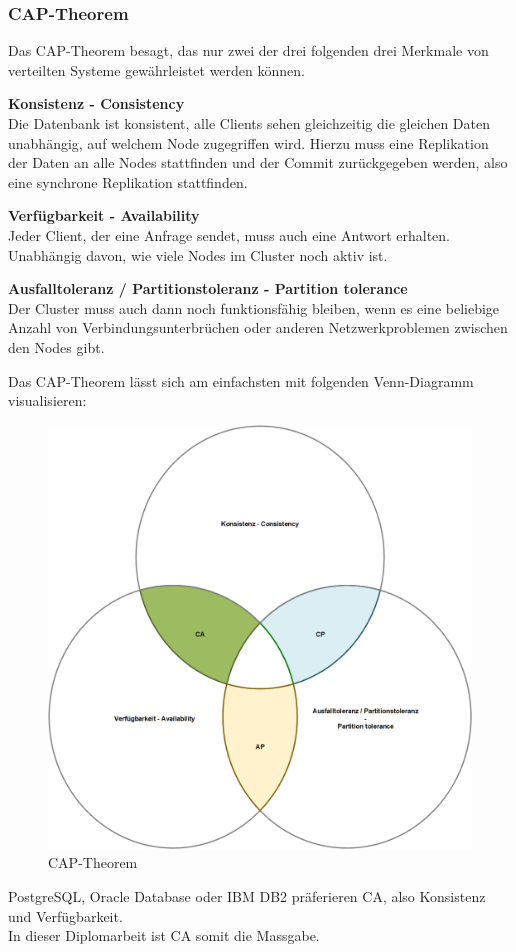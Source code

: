 
\clearpage
\subsubsection{CAP-Theorem}
Das CAP-Theorem besagt, das nur zwei der drei folgenden drei Merkmale von verteilten Systeme gewährleistet werden können\cite{EE6EQHU2}.
\begin{flushleft}
\textbf{Konsistenz - Consistency}\\
    Die Datenbank ist konsistent, alle Clients sehen gleichzeitig die gleichen Daten unabhängig, auf welchem Node zugegriffen wird.
    Hierzu muss eine Replikation der Daten an alle Nodes stattfinden und der Commit zurückgegeben werden, also eine synchrone Replikation stattfinden.
\end{flushleft}
\begin{flushleft}
\textbf{Verfügbarkeit - Availability}\\
    Jeder Client, der eine Anfrage sendet, muss auch eine Antwort erhalten.
    Unabhängig davon, wie viele Nodes im Cluster noch aktiv ist.
\end{flushleft}
\begin{flushleft}
\textbf{Ausfalltoleranz / Partitionstoleranz - Partition tolerance}\\
    Der Cluster muss auch dann noch funktionsfähig bleiben, wenn es eine beliebige Anzahl von Verbindungsunterbrüchen oder anderen Netzwerkproblemen zwischen den Nodes gibt.
\end{flushleft}
\begin{flushleft}
    Das CAP-Theorem lässt sich am einfachsten mit folgenden Venn-Diagramm visualisieren:
    \begin{figure}[H]
        \centering
        \includegraphics[width=0.5\linewidth]{source/implementation/evaluation/excursus_architecture/cap_theorem}
        \caption{CAP-Theorem}
        \label{fig:cap_theorem}
    \end{figure}
    \Gls{PostgreSQL}, \Gls{Oracle Database} oder \Gls{IBM DB2} präferieren CA, also Konsistenz und Verfügbarkeit.\\
    In dieser Diplomarbeit ist CA somit die Massgabe.
\end{flushleft}